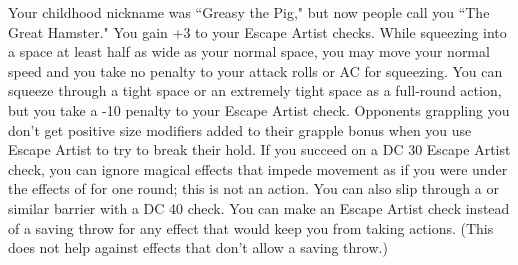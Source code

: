 {Your childhood nickname was ``Greasy the Pig," but now people call you ``The Great Hamster."}
{You gain +3 to your Escape Artist checks.}
{While squeezing into a space at least half as wide as your normal space, you may move your normal speed and you take no penalty to your attack rolls or AC for squeezing.}
{You can squeeze through a tight space or an extremely tight space as a full-round action, but you take a -10 penalty to your Escape Artist check. Opponents grappling you don't get positive size modifiers added to their grapple bonus when you use Escape Artist to try to break their hold.}
{If you succeed on a DC 30 Escape Artist check, you can ignore magical effects that impede movement as if you were under the effects of  for one round; this is not an action. You can also slip through a  or similar barrier with a DC 40 check.}
{You can make an Escape Artist check instead of a saving throw for any effect that would keep you from taking actions. (This does not help against effects that don't allow a saving throw.)}